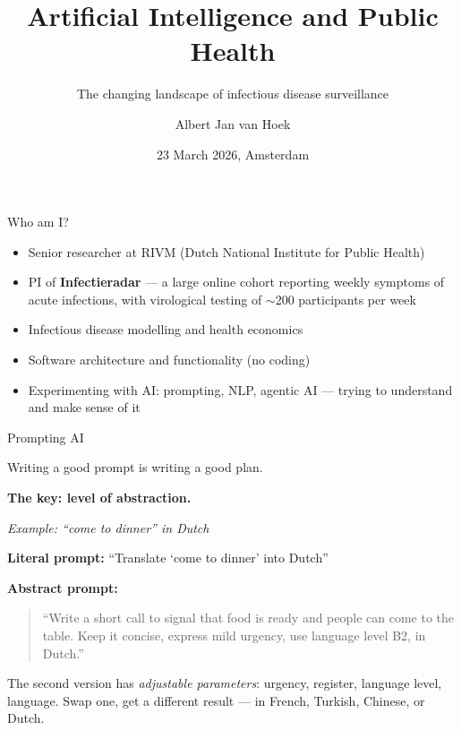 \documentclass[aspectratio=169]{beamer}
\title{Artificial Intelligence and Public Health}
\subtitle{The changing landscape of infectious disease surveillance}
\author{Albert Jan van Hoek}
\institute{RIVM --- National Institute for Public Health and the Environment}
\date{23 March 2026, Amsterdam}
\begin{document}
\maketitle

\begin{frame}{Who am I?}
  \begin{itemize}
    \item Senior researcher at RIVM (Dutch National Institute for Public Health)
    \item PI of \textbf{Infectieradar} --- a large online cohort reporting weekly
          symptoms of acute infections, with virological testing of $\sim$200
          participants per week
    \item Infectious disease modelling and health economics
    \item Software architecture and functionality (no coding)
    \item Experimenting with AI: prompting, NLP, agentic AI --- trying to
          understand and make sense of it
  \end{itemize}
\end{frame}

\begin{frame}{Prompting AI}
  \begin{center}
    \large Writing a good prompt is writing a good plan.
  \end{center}
  \vspace{1em}
  \textbf{The key: level of abstraction.}
  \vspace{1em}

  \textit{Example: ``come to dinner'' in Dutch}

  \medskip
  \textbf{Literal prompt:} ``Translate `come to dinner' into Dutch''

  \medskip
  \textbf{Abstract prompt:}
  \begin{quote}
  ``Write a short call to signal that food is ready and people can come to
    the table. Keep it concise, express mild urgency, use language level B2,
    in Dutch.''
  \end{quote}

  The second version has \emph{adjustable parameters}: urgency, register,
  language level, language. Swap one, get a different result --- in French,
  Turkish, Chinese, or Dutch.
\end{frame}
\end{document}

